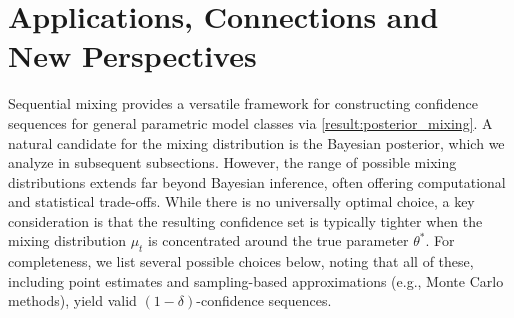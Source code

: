 


\section{Applications, Connections and New Perspectives}

Sequential mixing provides a versatile framework for constructing confidence sequences for general parametric model classes via \cref{result:posterior_mixing}. A natural candidate for the mixing distribution is the Bayesian posterior, which we analyze in subsequent subsections. However, the range of possible mixing distributions extends far beyond Bayesian inference, often offering computational and statistical trade-offs. While there is no universally optimal choice, a key consideration is that the resulting confidence set is typically tighter when the mixing distribution $\mu_t$ is concentrated around the true parameter $\theta^*$. For completeness, we list several possible choices below, noting that all of these, including point estimates and sampling-based approximations (e.g., Monte Carlo methods), yield valid $(1-\delta)$-confidence sequences.

